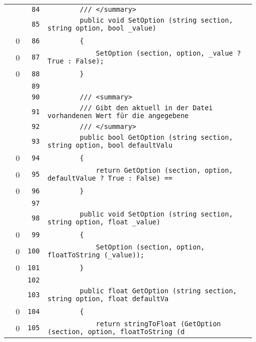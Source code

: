 \documentclass[a4paper,10pt]{article}
\begin{document}
\begin{longtable}[l]{lrrl}
\cellcolor{gray} &  & \verb~84~ & \verb~        /// </summary>~\\
\cellcolor{gray} &  & \verb~85~ & \verb~        public void SetOption (string section, string option, bool _value)~\\
\cellcolor{red} & 0 & \verb~86~ & \verb~        {~\\
\cellcolor{red} & 0 & \verb~87~ & \verb~            SetOption (section, option, _value ? True : False);~\\
\cellcolor{red} & 0 & \verb~88~ & \verb~        }~\\
\cellcolor{gray} &  & \verb~89~ & \verb~~\\
\cellcolor{gray} &  & \verb~90~ & \verb~        /// <summary>~\\
\cellcolor{gray} &  & \verb~91~ & \verb~        /// Gibt den aktuell in der Datei vorhandenen Wert für die angegebene ~\\
\cellcolor{gray} &  & \verb~92~ & \verb~        /// </summary>~\\
\cellcolor{gray} &  & \verb~93~ & \verb~        public bool GetOption (string section, string option, bool defaultValu~\\
\cellcolor{red} & 0 & \verb~94~ & \verb~        {~\\
\cellcolor{red} & 0 & \verb~95~ & \verb~            return GetOption (section, option, defaultValue ? True : False) ==~\\
\cellcolor{red} & 0 & \verb~96~ & \verb~        }~\\
\cellcolor{gray} &  & \verb~97~ & \verb~~\\
\cellcolor{gray} &  & \verb~98~ & \verb~        public void SetOption (string section, string option, float _value)~\\
\cellcolor{red} & 0 & \verb~99~ & \verb~        {~\\
\cellcolor{red} & 0 & \verb~100~ & \verb~            SetOption (section, option, floatToString (_value));~\\
\cellcolor{red} & 0 & \verb~101~ & \verb~        }~\\
\cellcolor{gray} &  & \verb~102~ & \verb~~\\
\cellcolor{gray} &  & \verb~103~ & \verb~        public float GetOption (string section, string option, float defaultVa~\\
\cellcolor{red} & 0 & \verb~104~ & \verb~        {~\\
\cellcolor{red} & 0 & \verb~105~ & \verb~            return stringToFloat (GetOption (section, option, floatToString (d~\\

\end{longtable}
\end{document}
